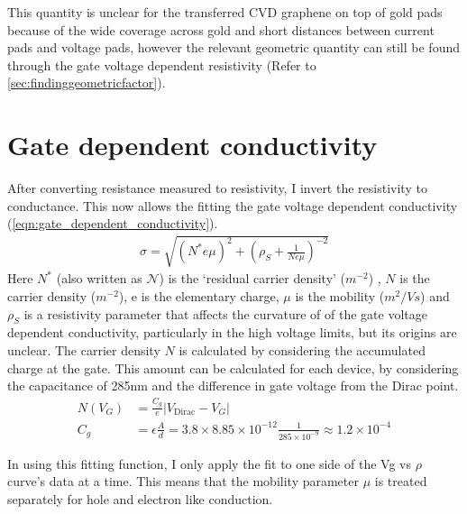 \documentclass[../Matt_Gebert_Honours_Thesis.tex]{subfiles}
\begin{document}
This quantity is unclear for the transferred CVD graphene on top of gold pads because of the wide coverage across gold and short distances between current pads and voltage pads, however the relevant geometric quantity can still be found through the gate voltage dependent resistivity (Refer to \cref{sec:findinggeometricfactor}).

\section{Gate dependent conductivity}
After converting resistance measured to resistivity, I invert the resistivity to conductance. This now allows the fitting the gate voltage dependent conductivity (\cref{eqn:gate_dependent_conductivity}).
\begin{align}
\sigma = \sqrt{\left(N^{*} e \mu\right)^2 + \left(\rho_S + \frac{1}{N e \mu}\right)^{-2}} \label{eqn:gate_dependent_conductivity}
\end{align}
Here $N^{*}$ (also written as $\mathcal{N}$) is the `residual carrier density'  ($m^{-2}$) \cite{adam_self-consistent_2007}, $N$ is the carrier density ($m^{-2}$), e is the elementary charge, $\mu$ is the mobility ($m^2/Vs$) and $\rho_S$ is a resistivity parameter that affects the curvature of of the gate voltage dependent conductivity, particularly in the high voltage limits, but its origins are unclear.
The carrier density $N$ is calculated by considering the accumulated charge at the gate. This amount can be calculated for each device, by considering the capacitance of 285nm \silicondioxide{} and the difference in gate voltage from the Dirac point.
\begin{align}
	N(V_G) &= \frac{C_g}{e} \left|V_{\text{Dirac}}-V_G\right|\\
	C_g &= \epsilon \frac{A}{d} = 3.8 \times 8.85 \times 10^{-12} \frac{1}{285\times 10^{-9}} \approx 1.2 \times 10^{-4}
\end{align}

In using this fitting function, I only apply the fit to one side of the Vg vs $\rho$ curve's data at a time. This means that the mobility parameter $\mu$ is treated separately for hole and electron like conduction. 
\end{document}
